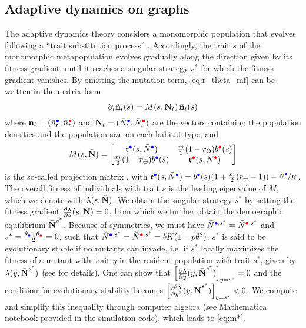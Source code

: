\subsection{Adaptive dynamics on graphs}
The adaptive dynamics theory considers a monomorphic population that evolves following a “trait substitution process” \citep{Meszena1997}. Accordingly, the trait $s$ of the monomorphic metapopulation evolves gradually along the direction given by its fitness gradient, until it reaches a singular strategy $s^*$ for which the fitness gradient vanishes. By omitting the mutation term, \cref{eq:r_theta_mf} can be written in the matrix form
\begin{equation}
  \partial_t \bar{\textbf n}_t(s) = M(s, \bar{\textbf N}_t) \, \bar{\textbf n}_t(s)
\end{equation}
where $\bar{\textbf n}_t = (\bar{n}^{\bcirc}_t, \bar{n}^{\rcirc}_t)$ and
$\bar{\textbf N}_t = (\bar{N}^{\bcirc}_t, \bar{N}^{\rcirc}_t)$ are the vectors containing the population densities and the population size on each habitat type, and
\begin{equation}
M(s, \bar{\textbf N}) = 
\begin{bmatrix}
  \rr^{\bcirc}(s,\bar{N}^{\bcirc}) & \tfrac{m}{2} (1-r_\Theta)b^{\rcirc}(s) \\
  \tfrac{m}{2} (1-r_\Theta)b^{\bcirc}(s) & \rr^{\rcirc}(s,\bar{N}^{\rcirc})
\end{bmatrix}
\end{equation} 
is the so-called projection matrix \citep{Meszena1997}, with 
$\rr^{\bcirc}(s,\bar{N}^{\bcirc}) = b^{{\bcirc}}(s)(1+\tfrac{m}{2} (r_\Theta-1)) - \nicefrac{\bar{N}^{\bcirc}}{K}$. The overall fitness of individuals with trait $s$ is the leading eigenvalue of $M$, which we denote with $\lambda(s,\bar{\textbf N})$. We obtain the singular strategy $s^*$ by setting the fitness gradient $\frac{\partial \lambda}{\partial s} (s, \bar{\textbf N}) = 0$, from which we further obtain the demographic equilibrium $\bar{\textbf N}^{s^{*}}$. Because of symmetries, we must have $\bar{N}^{\bcirc,s^*} = \bar{N}^{\rcirc,s^*} $ and $s^* = \frac{\theta_{\bcirc} +\theta_{\rcirc}}{2} =0$, such that $\bar{N}^{\bcirc,s^*} = \bar{N}^{\rcirc,s^*} = bK(1 - p \theta^2)$. $s^*$ is said to be evolutionary stable if no mutants can invade, i.e. if $s^*$ locally maximizes the fitness of a mutant with trait $y$ in the resident population with trait $s^*$, given by $\lambda(y, \bar{\textbf N}^{s^*})$ (see \citep{Meszena1997} for details). One can show that $\left[ \frac{\partial \lambda}{\partial y}(y, \bar{\textbf N}^{s^*}) \right]_{y = s^*} = 0$ and the condition for evolutionary stability becomes $ \left[ \frac{\partial^2 \lambda}{\partial y^2}(y, \bar{\textbf N}^{s^*}) \right]_{y = s^*} < 0 $. We compute and simplify this inequality through computer algebra (see Mathematica notebook provided in the simulation code), which leads to \cref{eq:m*}.

